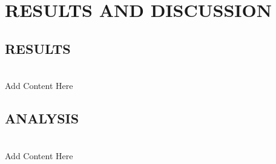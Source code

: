 \chapter{\centering \textbf{\MakeUppercase{Results and Discussion}}}

\section{\textbf{\MakeUppercase{Results}}}
\\Add Content Here\\

\section{\textbf{\MakeUppercase{Analysis}}}
\\Add Content Here\\


